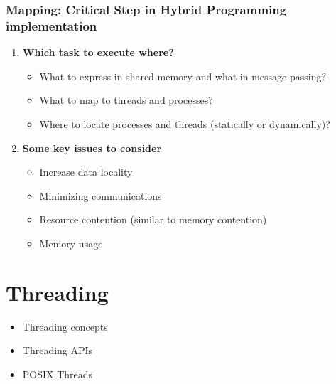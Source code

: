 \documentclass[12pt, a4paper]{report}
\begin{document}
\subsection{Mapping: Critical Step in Hybrid Programming implementation}
\begin{enumerate}[label=\bfseries (\alph*)]
    \item {\bfseries Which task to execute where?}
        \begin{itemize}
            \item What to express in shared memory and what in message passing?
            \item What to map to threads and processes?
            \item Where to locate processes and threads (statically or dynamically)?
        \end{itemize}

    \item {\bfseries Some key issues to consider}
        \begin{itemize}
            \item Increase data locality
            \item Minimizing communications
            \item Resource contention (similar to memory contention)
            \item Memory usage
        \end{itemize}
\end{enumerate}






\chapter{Threading}
\begin{tcolorbox}[width=\textwidth,colback={white},title={In this chapter\dots},colbacktitle={lightslategray},coltitle=white]    
    \begin{itemize}
        \item Threading concepts
        \item Threading APIs
        \item POSIX Threads
    \end{itemize}
 \end{tcolorbox}
 
\end{document}

